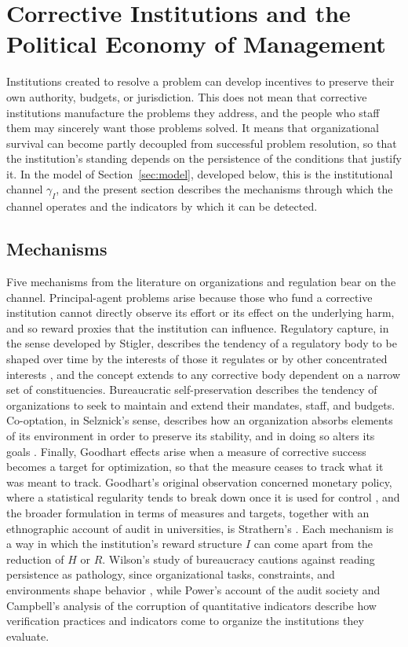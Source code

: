 \documentclass[12pt]{article}
\theoremstyle{remark}
\begin{document}
\section{Corrective Institutions and the Political Economy of Management}
\label{sec:inst}

Institutions created to resolve a problem can develop incentives to preserve their own authority, budgets, or jurisdiction. This does not mean that corrective institutions manufacture the problems they address, and the people who staff them may sincerely want those problems solved. It means that organizational survival can become partly decoupled from successful problem resolution, so that the institution's standing depends on the persistence of the conditions that justify it. In the model of Section~\ref{sec:model}, developed below, this is the institutional channel $\gamma_I$, and the present section describes the mechanisms through which the channel operates and the indicators by which it can be detected.

\subsection{Mechanisms}

Five mechanisms from the literature on organizations and regulation bear on the channel. Principal-agent problems arise because those who fund a corrective institution cannot directly observe its effort or its effect on the underlying harm, and so reward proxies that the institution can influence. Regulatory capture, in the sense developed by Stigler, describes the tendency of a regulatory body to be shaped over time by the interests of those it regulates or by other concentrated interests \cite{stigler1971}, and the concept extends to any corrective body dependent on a narrow set of constituencies. Bureaucratic self-preservation describes the tendency of organizations to seek to maintain and extend their mandates, staff, and budgets. Co-optation, in Selznick's sense, describes how an organization absorbs elements of its environment in order to preserve its stability, and in doing so alters its goals \cite{selznick1949}. Finally, Goodhart effects arise when a measure of corrective success becomes a target for optimization, so that the measure ceases to track what it was meant to track. Goodhart's original observation concerned monetary policy, where a statistical regularity tends to break down once it is used for control \cite{goodhart1984}, and the broader formulation in terms of measures and targets, together with an ethnographic account of audit in universities, is Strathern's \cite{strathern1997}. Each mechanism is a way in which the institution's reward structure $I$ can come apart from the reduction of $H$ or $R$. Wilson's study of bureaucracy cautions against reading persistence as pathology, since organizational tasks, constraints, and environments shape behavior \cite{wilson1989}, while Power's account of the audit society \cite{power1997} and Campbell's analysis of the corruption of quantitative indicators \cite{campbell1979} describe how verification practices and indicators come to organize the institutions they evaluate.
\end{document}
